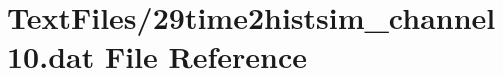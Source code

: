\hypertarget{29time2histsim__channel10_8dat}{}\section{Text\+Files/29time2histsim\+\_\+channel10.dat File Reference}
\label{29time2histsim__channel10_8dat}
